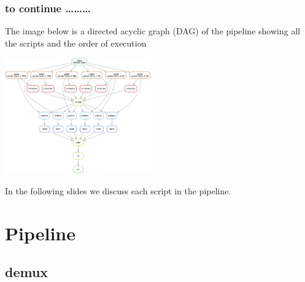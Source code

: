 \documentclass{beamer}
\newcommand{\pdfnarration}[1]{%
\onslide*<\value{beamerpauses}>{\pdfmargincomment[style=note,author=narration]{#1}}%
}
\renewcommand{\pdfnarration}[1]{}
\begin{document}
\begin{frame}
\frametitle{to continue \ldots \ldots \ldots  }


\alert<1> 


The image below is a directed acyclic graph (DAG) of the pipeline
showing all the scripts and the order of execution

\begin{center}
\includegraphics[height=5cm]{images/dag.png}
\end{center}

In the following slides we discuss each script in the pipeline.



\pdfnarration{
 [[slnc 1000]]
 Porpid Postproc is a pipeline of Julia scripts designed to assist with molecular sequence
 extraction from pooled samples. 
 [[sinc 1000]]
 In this example we see six samples each tagged with
 a unique molecular identifier but all pooled for one PacBio sequencing run.
 [[sinc 1000]]
 The pipeline performs demultiplexing of the three samples followed Porpid
 processing of each sample to be run in parallel. 
 [[sinc 1000]]
 In the slides that follow, we will describe each step in the pipeline in more detail.
[[slnc 1000]]
}

\end{frame}

\section{Pipeline}

\subsection{demux}
\end{document}

